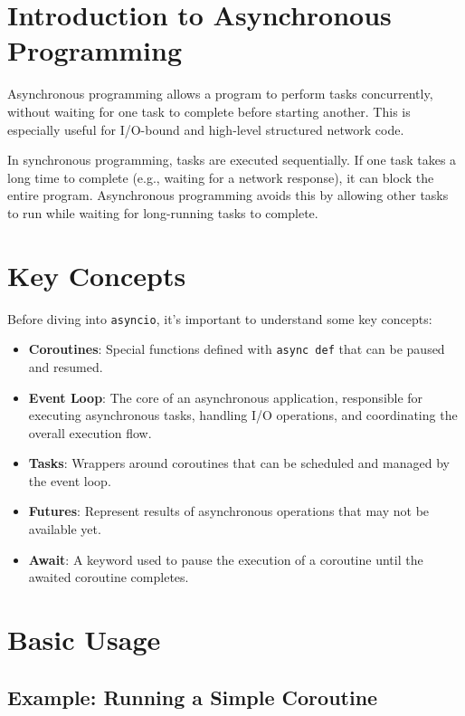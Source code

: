 \documentclass[
  letterpaper,
  DIV=11,
  numbers=noendperiod]{scrreprt}
\providecommand{\tightlist}{%
  \setlength{\itemsep}{0pt}\setlength{\parskip}{0pt}}\usepackage{longtable,booktabs,array}
\begin{document}
\section{Introduction to Asynchronous
Programming}\label{introduction-to-asynchronous-programming}

Asynchronous programming allows a program to perform tasks concurrently,
without waiting for one task to complete before starting another. This
is especially useful for I/O-bound and high-level structured network
code.

In synchronous programming, tasks are executed sequentially. If one task
takes a long time to complete (e.g., waiting for a network response), it
can block the entire program. Asynchronous programming avoids this by
allowing other tasks to run while waiting for long-running tasks to
complete.

\section{Key Concepts}\label{key-concepts-1}

Before diving into \texttt{asyncio}, it's important to understand some
key concepts:

\begin{itemize}
\tightlist
\item
  \textbf{Coroutines}: Special functions defined with
  \texttt{async\ def} that can be paused and resumed.
\item
  \textbf{Event Loop}: The core of an asynchronous application,
  responsible for executing asynchronous tasks, handling I/O operations,
  and coordinating the overall execution flow.
\item
  \textbf{Tasks}: Wrappers around coroutines that can be scheduled and
  managed by the event loop.
\item
  \textbf{Futures}: Represent results of asynchronous operations that
  may not be available yet.
\item
  \textbf{Await}: A keyword used to pause the execution of a coroutine
  until the awaited coroutine completes.
\end{itemize}

\section{Basic Usage}\label{basic-usage-3}

\subsection{Example: Running a Simple
Coroutine}\label{example-running-a-simple-coroutine}
\end{document}
